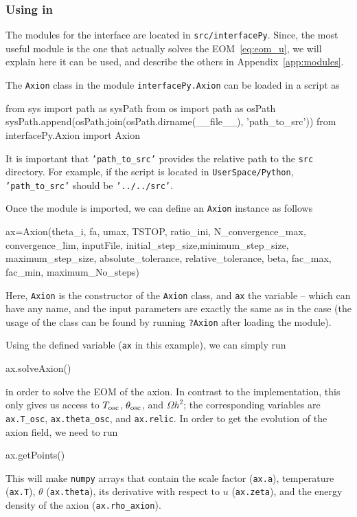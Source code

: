 \documentclass[11pt,a4paper]{article}
\begin{document}
\subsubsection{Using \mimes in \PY} The modules for the \PY interface are located in {\tt src/interfacePy}. Since, the most useful module is the one that actually solves the EOM~\ref{eq:eom_u}, we will explain here it can be used, and describe the others in Appendix~\ref{app:modules}.

The {\tt Axion} class in the module {\tt interfacePy.Axion} can be loaded in a \PY script as 
%
\begin{py}
	from sys import path as sysPath
	from os import path as osPath
	sysPath.append(osPath.join(osPath.dirname(__file__), 'path_to_src'))
	from interfacePy.Axion import Axion
\end{py}
%
It is important that \texttt{'path_to_src'} provides the relative path to the {\tt src} directory. For example, if the script is located in {\tt UserSpace/Python}, \texttt{'path_to_src'} should be \texttt{'../../src'}.

Once the module is imported, we can define an {\tt Axion} instance as follows 
%
\begin{py}
	ax=Axion(theta_i, fa, umax, TSTOP, ratio_ini, N_convergence_max, convergence_lim, inputFile,
	initial_step_size,minimum_step_size, maximum_step_size, absolute_tolerance, 
	relative_tolerance, beta, fac_max, fac_min, maximum_No_steps)
\end{py}
%
Here, {\tt Axion} is the constructor of the {\tt Axion} class, and {\tt ax} the variable -- which can have any name, and the input parameters are exactly the same as in the \CPP case (the usage of the class can be found by running {\tt ?Axion} after loading the module). 

Using the defined variable ({\tt ax} in this example), we can simply run  
%
\begin{py}
	ax.solveAxion()
\end{py}
%
in order to solve the EOM of the axion. In contrast to the \CPP implementation, this only gives us access to $T_{\rm osc}{}$, $\theta_{\rm osc}{}$, and $\Omega h^2$; the corresponding variables are {\tt ax.T\_osc}, {\tt ax.theta\_osc}, and {\tt ax.relic}. In order to get the evolution of the axion field, we need to run 
%
\begin{py}
	ax.getPoints()
\end{py}
%
This will make {\tt numpy} arrays that contain the scale factor ({\tt ax.a}), temperature ({\tt ax.T}), $\theta$ ({\tt ax.theta}), its derivative with respect to $u$ ({\tt ax.zeta}), and the energy density of the axion ({\tt ax.rho\_axion}).
\end{document}
